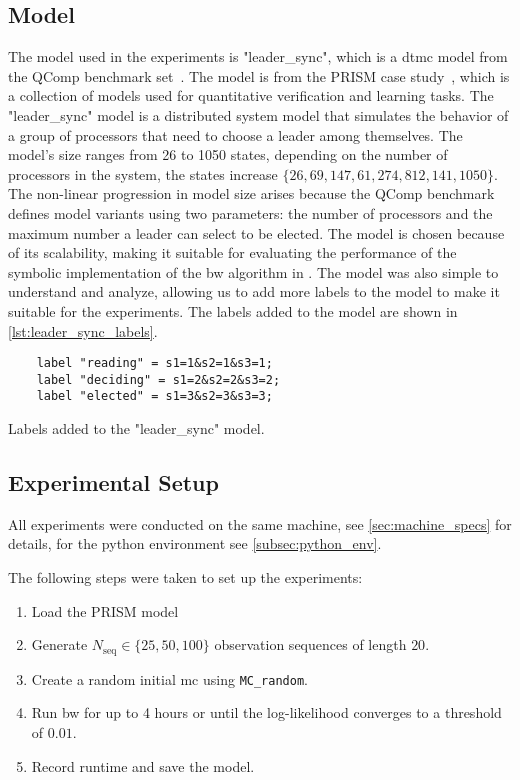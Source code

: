 \subsection{Model}
The model used in the experiments is "leader\_sync", which is a \gls{dtmc} model from the QComp benchmark set~\cite{hartmanns2019quantitative}.
The model is from the PRISM case study~\cite{kwiatkowska2012prism}, which is a collection of models used for quantitative verification and learning tasks.
The "leader\_sync" model is a distributed system model that simulates the behavior of a group of processors that need to choose a leader among themselves.
The model's size ranges from 26 to 1050 states, depending on the number of processors in the system, the states increase $\{26, 69, 147, 61, 274, 812, 141, 1050\}$.
The non-linear progression in model size arises because the QComp benchmark defines model variants using two parameters: the number of processors and the maximum number a leader can select to be elected.
The model is chosen because of its scalability, making it suitable for evaluating the performance of the symbolic implementation of the \gls{bw} algorithm in \JajapyTwo.
The model was also simple to understand and analyze, allowing us to add more labels to the model to make it suitable for the experiments.
The labels added to the model are shown in \autoref{lst:leader_sync_labels}.

\begin{listing}[htb!]
    \begin{verbatim}
    label "reading" = s1=1&s2=1&s3=1;
    label "deciding" = s1=2&s2=2&s3=2;
    label "elected" = s1=3&s2=3&s3=3;
    \end{verbatim}
    \caption{Labels added to the "leader\_sync" model.}
    \label{lst:leader_sync_labels}
\end{listing}


\subsection{Experimental Setup}
All experiments were conducted on the same machine, see \autoref{sec:machine_specs} for details, for the python environment see \autoref{subsec:python_env}.

The following steps were taken to set up the experiments:
\begin{enumerate}
    \item Load the PRISM model
    \item Generate $N_\text{seq}\in\{25,50,100\}$ observation sequences of length $20$.
    \item Create a random initial \gls{mc} using \texttt{MC\_random}.
    \item Run \gls{bw} for up to 4 hours or until the log-likelihood converges to a threshold of $0.01$.
    \item Record runtime and save the model.
\end{enumerate}

